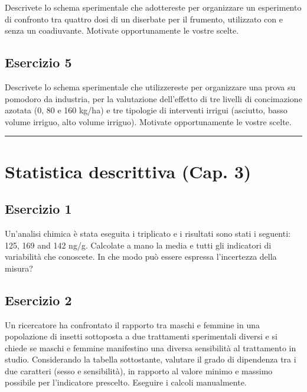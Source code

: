 \documentclass[a4paper,12pt,oneside]{book}
\begin{document}
Descrivete lo schema sperimentale che adottereste per organizzare un esperimento di confronto tra quattro dosi di un diserbate per il frumento, utilizzato con e senza un coadiuvante. Motivate opportunamente le vostre scelte.

\hypertarget{esercizio-5}{%
\subsection{Esercizio 5}\label{esercizio-5}}

Descrivete lo schema sperimentale che utilizzereste per organizzare una prova su pomodoro da industria, per la valutazione dell'effetto di tre livelli di concimazione azotata (0, 80 e 160 kg/ha) e tre tipologie di interventi irrigui (asciutto, basso volume irriguo, alto volume irriguo). Motivate opportunamente le vostre scelte.

\begin{center}\rule{0.5\linewidth}{0.5pt}\end{center}

\hypertarget{statistica-descrittiva-cap.-3}{%
\section{Statistica descrittiva (Cap. 3)}\label{statistica-descrittiva-cap.-3}}

\hypertarget{esercizio-1-1}{%
\subsection{Esercizio 1}\label{esercizio-1-1}}

Un'analisi chimica è stata eseguita i triplicato e i risultati sono stati i seguenti: 125, 169 and 142 ng/g. Calcolate a mano la media e tutti gli indicatori di variabilità che conoscete. In che modo può essere espressa l'incertezza della misura?

\hypertarget{esercizio-2-1}{%
\subsection{Esercizio 2}\label{esercizio-2-1}}

Un ricercatore ha confrontato il rapporto tra maschi e femmine in una popolazione di insetti sottoposta a due trattamenti sperimentali diversi e si chiede se maschi e femmine manifestino una diversa sensibilità al trattamento in studio. Considerando la tabella sottostante, valutare il grado di dipendenza tra i due caratteri (sesso e sensibilità), in rapporto al valore minimo e massimo possibile per l'indicatore prescelto. Eseguire i calcoli manualmente.
\end{document}
